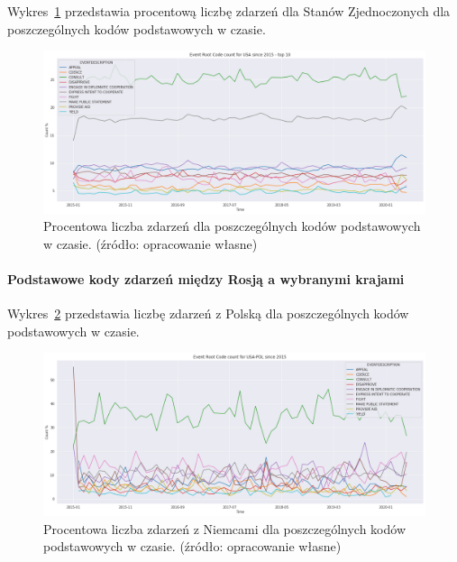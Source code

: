 \documentclass[11pt]{report}
\begin{document}
    Wykres~\ref{fig:USAPERCpercinTIME} przedstawia procentową liczbę zdarzeń dla Stanów Zjednoczonych dla poszczególnych kodów podstawowych w czasie.
    \begin{figure}[!htp]
        \centering
        \includegraphics[width=1 \textwidth]{fig/USA/USAERCpercinTIME.png}
        \caption{Procentowa liczba zdarzeń dla poszczególnych kodów podstawowych w czasie. (źródło: opracowanie własne)}
        \label{fig:USAPERCpercinTIME}
    \end{figure}

    \paragraph{Podstawowe kody zdarzeń między Rosją a wybranymi krajami}

    Wykres~\ref{fig:USAPOLERC} przedstawia liczbę zdarzeń z Polską dla poszczególnych kodów podstawowych w czasie.
    \begin{figure}[!htp]
        \centering
        \includegraphics[width=1 \textwidth]{fig/USA/USAPOLERCperc.png}
        \caption{Procentowa liczba zdarzeń z Niemcami dla poszczególnych kodów podstawowych w czasie. (źródło: opracowanie własne)}
        \label{fig:USAPOLERC}
    \end{figure}
\end{document}
